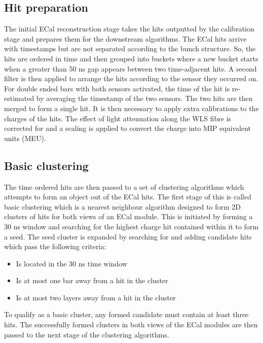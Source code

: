 \subsection{Hit preparation}
\label{subsec:ECalHitPerparation}
The initial ECal reconstruction stage takes the hits outputted by the calibration stage and prepares them for the downstream algorithms.  The ECal hits arrive with timestamps but are not separated according to the bunch structure.  So, the hits are ordered in time and then grouped into buckets where a new bucket starts when a greater than 50 ns gap appears between two time-adjacent hits.  A second filter is then applied to arrange the hits according to the sensor they occurred on.  For double ended bars with both sensors activated, the time of the hit is re-estimated by averaging the timestamp of the two sensors.  The two hits are then merged to form a single hit.
\newline
It is then necessary to apply extra calibrations to the charges of the hits.  The effect of light attenuation along the WLS fibre is corrected for and a scaling is applied to convert the charge into MIP equivalent units (MEU).

\subsection{Basic clustering}
\label{subsec:ECalBasicClustering}
The time ordered hits are then passed to a set of clustering algorithms which attempts to form an object out of the ECal hits.  The first stage of this is called basic clustering which is a nearest neighbour algorithm designed to form 2D clusters of hits for both views of an ECal module.  This is initiated by forming a 30 ns window and searching for the highest charge hit contained within it to form a seed.  The seed cluster is expanded by searching for and adding candidate hits which pass the following criteria:
\begin{itemize}
  \item Is located in the 30 ns time window
  \item Is at most one bar away from a hit in the cluster
  \item Is at most two layers away from a hit in the cluster
\end{itemize}
To qualify as a basic cluster, any formed candidate must contain at least three hits.  The successfully formed clusters in both views of the ECal modules are then passed to the next stage of the clustering algorithms. 

